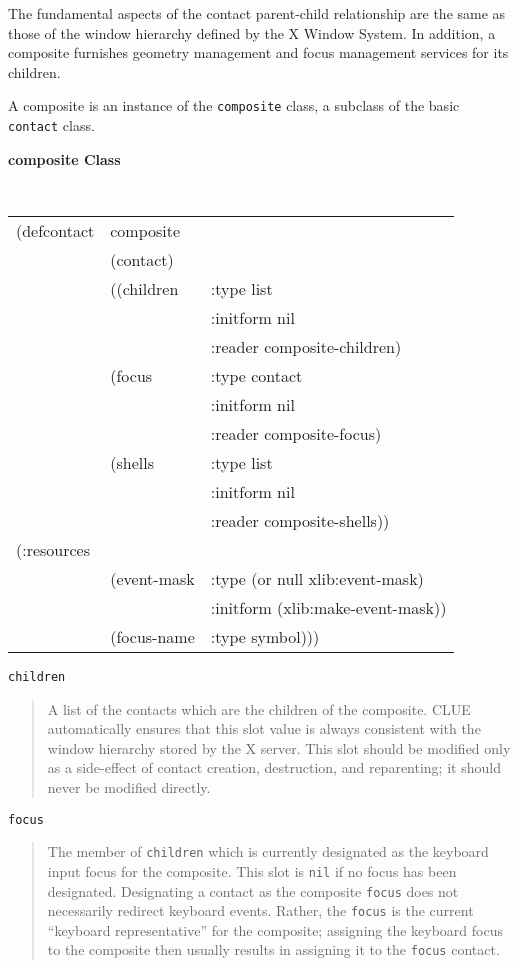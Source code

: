 The fundamental aspects of the contact parent-child relationship are the same as
those of the window hierarchy defined by the X Window System. In addition, a
composite furnishes geometry management and focus management services for
its children.

A composite is an instance of the {\tt composite} class, a
subclass of the basic {\tt contact} class.

{\samepage
{\large {\bf composite \hfill Class}} 
\begin{flushright} \parbox[t]{6.125in}{
\tt
\begin{tabular}{lll}
\raggedright
(defcontact & composite  & \\ 
& (contact) & \\
& ((children  & :type list\\
&     & :initform nil\\
&     & :reader composite-children)\\
& (focus  & :type contact\\
&     & :initform nil\\
&     & :reader composite-focus)\\
& (shells &:type list \\        
&     & :initform nil\\
&     & :reader composite-shells))\\
(:resources\\
&(event-mask & :type (or null xlib:event-mask)\\
&	     & :initform (xlib:make-event-mask))\\
&(focus-name & :type symbol)))
\end{tabular}
\rm

}\end{flushright}}

\begin{flushright} \parbox[t]{6.125in}{
{\tt children}
\begin{quote}
A list of the contacts which are the children of the composite. 
CLUE automatically ensures that this slot value is always consistent with the
window hierarchy stored by the X server.
This slot should be modified only as a side-effect of contact creation, 
destruction, and reparenting; it should
never be modified directly.
\end{quote}
}\end{flushright}


\begin{flushright} \parbox[t]{6.125in}{
{\tt focus}
\begin{quote}
The member of {\tt children} which is currently designated as the keyboard input
focus for the composite. This slot is {\tt nil} if no focus has been designated.
Designating a contact as  the composite {\tt focus} does not necessarily redirect
keyboard events. Rather, the {\tt focus} is the current ``keyboard
representative'' for the composite; assigning the keyboard focus to the
composite then usually results in assigning it to the {\tt focus}
contact.  \end{quote} }\end{flushright}

